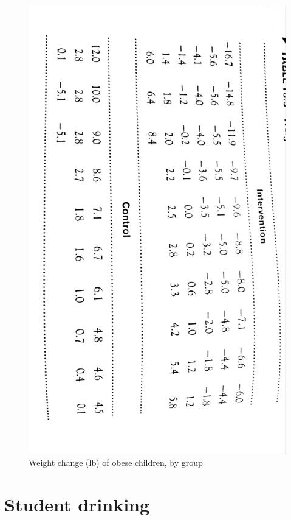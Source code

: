 \documentclass[letterpaper,9pt,twoside,printwatermark=false]{pinp}
\begin{document}
\begin{figure}
  \begin{center}
    \includegraphics[scale=0.35, angle=90]{a83-crop.pdf} 
  \end{center}
  \caption{Weight change (lb) of obese children, by group}\label{fig:tab1}
\end{figure}

\clearpage

\section{Student drinking}\label{student-drinking}
\end{document}
